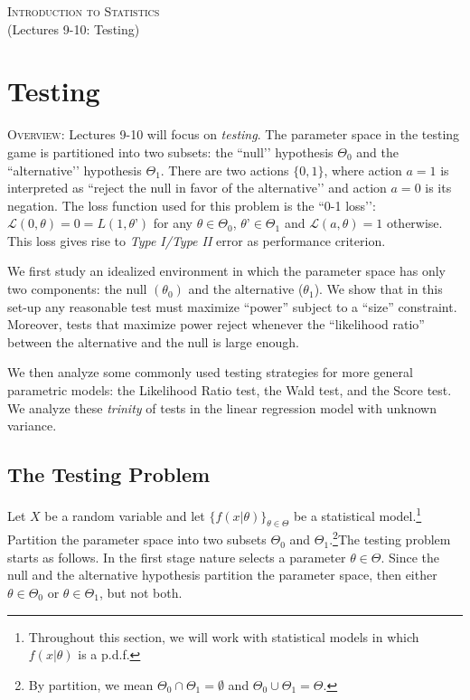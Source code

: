 \documentclass[11pt]{article} %
\begin{document}
\onehalfspace

\vspace*{\fill}
\begingroup
\centering

\Large {\scshape Introduction to Statistics}\\

(Lectures 9-10: Testing)

\endgroup
\vspace*{\fill}

\newpage


\section{Testing}

{\scshape Overview:} \noindent Lectures 9-10 will focus on \emph{testing}. The parameter space in the testing game is partitioned into two subsets: the ``null’’ hypothesis $\Theta_0$ and the ``alternative’’ hypothesis $\Theta_1$. There are two actions $\{0,1\}$, where action $a=1$ is interpreted as ``reject the null in favor of the alternative’’  and action $a=0$ is its negation. The loss function used for this problem is the ``0-1 loss’’: $\mathcal{L}(0,\theta) = 0 =  L(1,\theta’)$ for any $\theta \in \Theta_0$, $\theta’ \in \Theta_1$ and $\mathcal{L}(a,\theta)=1$ otherwise. This loss gives rise to \emph{Type I/Type II} error as performance criterion. 

We first study an idealized environment in which the parameter space has only two components: the null $(\theta_0)$ and the alternative ($\theta_1$). We show that in this set-up any reasonable test must maximize “power” subject to a “size” constraint. Moreover, tests that maximize power reject whenever the “likelihood ratio” between the alternative and the null is large enough. 


We then analyze some commonly used testing strategies for more general parametric models: the Likelihood Ratio test, the Wald test, and the Score test. We analyze these \emph{trinity} of tests in the linear regression model with unknown variance.  



\subsection{The Testing Problem} 

Let $X$ be a random variable and let $\{f(x | \theta)\}_{\theta \in \Theta}$ be a statistical model.\footnote{Throughout this section, we will work with statistical models in which $f(x | \theta)$ is a p.d.f.} Partition the parameter space into two subsets $\Theta_0$ and $\Theta_1$.\footnote{By partition, we mean $\Theta_0 \cap \Theta_1 = \emptyset$ and $\Theta_0 \cup \Theta_1 = \Theta$.}The testing problem starts as follows. In the first stage nature selects a parameter $\theta \in \Theta$. Since the null and the alternative hypothesis partition the parameter space, then either $\theta \in \Theta_0$ or $\theta \in \Theta_1$, but not both. 
\end{document}
